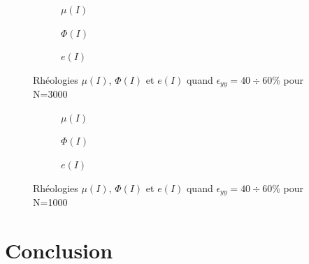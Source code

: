 \documentclass[5p,authoryear,square]{elsarticle}
\begin{document}
\begin{figure}[p]
    \centering
    \begin{subfigure}[b]{0.3\textwidth}
        \centering
        \scalebox{0.5}{}
        \caption{$\mu(I)$}
        \label{fig:3000_mu_I_fit}
    \end{subfigure}
    \hfill
    \begin{subfigure}[b]{0.3\textwidth}
        \centering
        \scalebox{0.5}{}
        \caption{$\Phi(I)$}
        \label{fig:3000_phi_I_fit}
    \end{subfigure}
    \hfill
    \begin{subfigure}[b]{0.3\textwidth}
        \centering
        \scalebox{0.5}{}
        \caption{$e(I)$}
        \label{fig:3000_e_I_fit}
    \end{subfigure}
    \caption{Rhéologies $\mu(I)$, $\Phi(I)$ et $e(I)$ quand $\epsilon_{yy} = 40 \div 60\%$ pour N=3000}
    \label{fig:rheologies_3000}
\end{figure}

\begin{figure}[p]
    \centering
    \begin{subfigure}[b]{0.3\textwidth}
        \centering
        \scalebox{0.5}{}
        \caption{$\mu(I)$}
        \label{fig:1000_mu_I_fit}
    \end{subfigure}
    \hfill
    \begin{subfigure}[b]{0.3\textwidth}
        \centering
        \scalebox{0.5}{}
        \caption{$\Phi(I)$}
        \label{fig:1000_phi_I_fit}
    \end{subfigure}
    \hfill
    \begin{subfigure}[b]{0.3\textwidth}
        \centering
        \scalebox{0.5}{}
        \caption{$e(I)$}
        \label{fig:1000_e_I_fit}
    \end{subfigure}
    \caption{Rhéologies $\mu(I)$, $\Phi(I)$ et $e(I)$ quand $\epsilon_{yy} = 40 \div 60\%$ pour N=1000}
    \label{fig:rheologies_1000}
\end{figure}

\section{Conclusion}\label{discussion}
\end{document}
